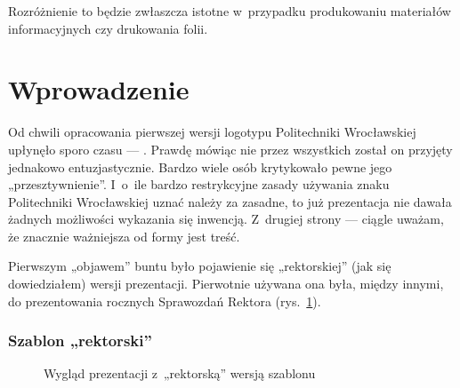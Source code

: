 \documentclass[12pt,aspectratio=169,ignorenonframetext]{beamer}
\begin{document}
Rozróżnienie to będzie zwłaszcza istotne w~przypadku produkowaniu materiałów informacyjnych czy drukowania folii.

\section{Wprowadzenie}

Od chwili opracowania pierwszej wersji logotypu Politechniki Wrocławskiej \cite{siw2004} upłynęło sporo czasu — . Prawdę mówiąc nie przez wszystkich został on przyjęty jednakowo entuzjastycznie. Bardzo wiele osób krytykowało pewne jego „przesztywnienie”. I~o~ile bardzo restrykcyjne zasady używania znaku Politechniki  Wrocławskiej uznać należy za zasadne, to już prezentacja nie dawała żadnych możliwości wykazania się inwencją. Z~drugiej strony — ciągle uważam, że znacznie ważniejsza od formy jest treść.

Pierwszym „objawem” buntu było pojawienie się „rektorskiej” (jak się dowiedziałem) wersji prezentacji. Pierwotnie używana ona była, między innymi, do prezentowania rocznych Sprawozdań Rektora (rys.~\ref{rektorska}).

\begin{frame}
 \frametitle<presentation>{Szablon „rektorski”}
 \begin{figure}
  \caption{Wygląd prezentacji z~„rektorską” wersją szablonu}\label{rektorska}
 \end{figure}
\end{frame}
\end{document}
